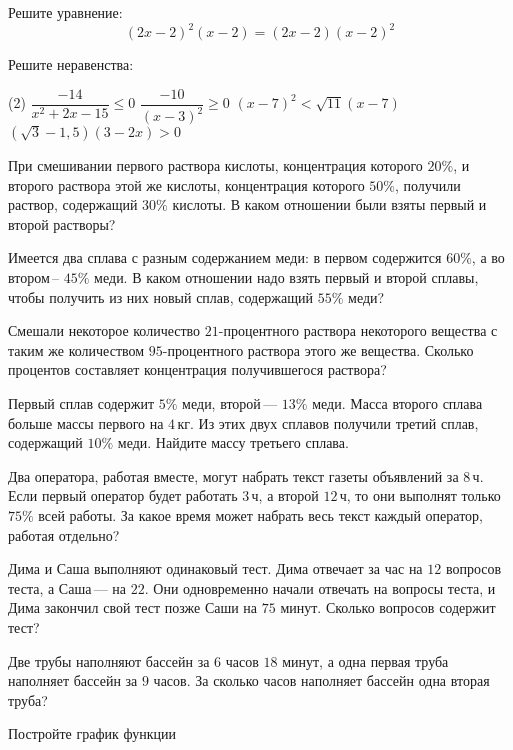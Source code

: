 \begin{consultation}
	\begin{listofex}
		\item Решите уравнение:
		\[(2x-2)^2(x-2)=(2x-2)(x-2)^2\]
		\item Решите неравенства:
		\begin{tasks}(2)
			\task \( \dfrac{-14}{x^2+2x-15}\le0 \)
			\task \( \dfrac{-10}{(x-3)^2}\ge0 \)
			\task \( (x-7)^2<\sqrt{11}(x-7) \)
			\task \( (\sqrt{3}-1,5)(3-2x)>0 \)
		\end{tasks}
		\item При смешивании первого раствора кислоты, концентрация которого \( 20\% \), и второго раствора этой же кислоты, концентрация которого \( 50\% \), получили раствор, содержащий \( 30\% \) кислоты. В каком отношении были взяты первый и второй растворы?
		\item Имеется два сплава с разным содержанием меди: в первом содержится \( 60\% \), а во втором -- \( 45\% \) меди. В каком отношении надо взять первый и второй сплавы, чтобы получить из них новый сплав, содержащий \( 55\% \) меди?
		\item Смешали некоторое количество \( 21 \)-процентного раствора некоторого вещества с таким же количеством \( 95 \)-процентного раствора этого же вещества. Сколько процентов составляет концентрация получившегося раствора?
		\item Первый сплав содержит \( 5\% \) меди, второй --- \( 13\% \) меди. Масса второго сплава больше массы первого на \( 4 \) кг. Из этих двух сплавов получили третий сплав, содержащий \( 10\% \) меди. Найдите массу третьего сплава.
		\item Два оператора, работая вместе, могут набрать текст газеты объявлений за \( 8 \) ч. Если первый оператор будет работать \( 3 \) ч, а второй \( 12 \) ч, то они выполнят только \( 75\% \) всей работы. За какое время может набрать весь текст каждый оператор, работая отдельно?
		\item Дима и Саша выполняют одинаковый тест. Дима отвечает за час на \( 12 \) вопросов теста, а Саша --- на \( 22 \). Они одновременно начали отвечать на вопросы теста, и Дима закончил свой тест позже Саши на \( 75 \) минут. Сколько вопросов содержит тест?
		\item Две трубы наполняют бассейн за \( 6 \) часов \( 18 \) минут, а одна первая труба наполняет бассейн за \( 9 \) часов. За сколько часов наполняет бассейн одна вторая труба?
		\item Постройте график функции

\end{listofex}
\end{consultation}
